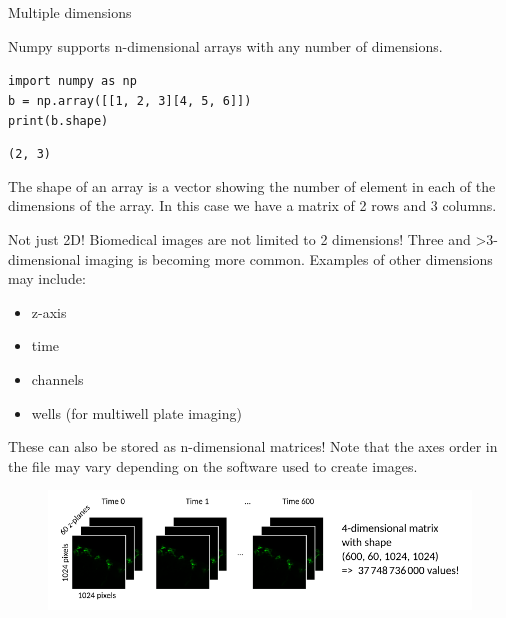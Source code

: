 \documentclass[9pt, aspectratio=169]{beamer}
\begin{document}
\begin{frame}
	{Multiple dimensions}

	Numpy supports n-dimensional arrays with any number of dimensions.

	\begin{codebox}
		\texttt{import numpy as np\\
			b = np.array([[1, 2, 3][4, 5, 6]])\\
			print(b.shape)
		}
	\end{codebox}

	\begin{codebox}
		{
			\texttt{(2, 3)}
		}
	\end{codebox}

	The shape of an array is a vector showing the number of element in each of the dimensions of the array. In this case we have a matrix of 2 rows and 3 columns.
\end{frame}

\begin{frame}
	{Not just 2D!}
	Biomedical images are not limited to 2 dimensions!
	Three and >3-dimensional imaging is becoming more common.
	\pause
	Examples of other dimensions may include:
	\begin{itemize}
		\item z-axis
		\item time
		\item channels
		\item wells (for multiwell plate imaging)
	\end{itemize}
	\pause
	These can also be stored as n-dimensional matrices! Note that the axes order in the file may vary depending on the software used to create images.
	\begin{figure}
		\centering
		\includegraphics[width=\textwidth]{multidimensional.png}
	\end{figure}
\end{frame}
\end{document}
